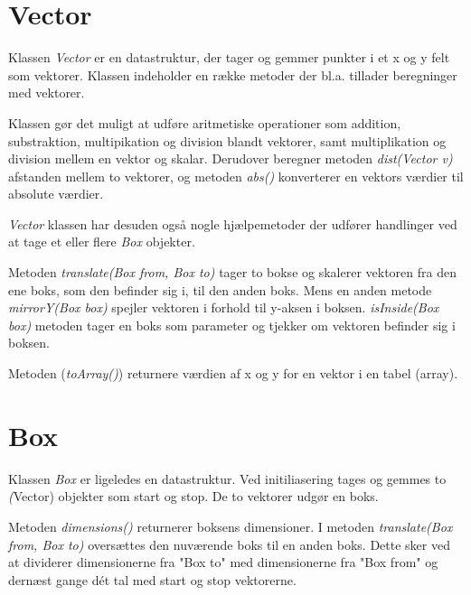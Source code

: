 \section{Vector}

Klassen \emph{Vector} er en datastruktur, der tager og gemmer punkter i et x og y felt som vektorer. Klassen indeholder en række metoder der bl.a. tillader beregninger med vektorer.

Klassen gør det muligt at udføre aritmetiske operationer som addition, substraktion, multipikation og division blandt vektorer, samt multiplikation og division mellem en vektor og skalar. Derudover beregner metoden \emph{dist(Vector v)} afstanden mellem to vektorer, og metoden \emph{abs()} konverterer en vektors værdier til absolute værdier.

\emph{Vector} klassen har desuden også nogle hjælpemetoder der udfører handlinger ved at tage et eller flere \emph{Box} objekter.

Metoden \emph{translate(Box from, Box to)} tager to bokse og skalerer vektoren fra den ene boks, som den befinder sig i, til den anden boks. Mens en anden metode \emph{mirrorY(Box box)} spejler vektoren i forhold til y-aksen i boksen. \emph{isInside(Box box)} metoden tager en boks som parameter og tjekker om vektoren befinder sig i boksen.

Metoden (\emph{toArray()}) returnere værdien af x og y for en vektor i en tabel (array).


\section{Box}

Klassen \emph{Box} er ligeledes en datastruktur. Ved initiliasering tages og gemmes to \emph(Vector) objekter som start og stop. De to vektorer udgør en boks.

Metoden \emph{dimensions()} returnerer boksens dimensioner. I metoden \emph{translate(Box from, Box to)} oversættes den nuværende boks til en anden boks. Dette sker ved at dividerer dimensionerne fra "Box to" med dimensionerne fra "Box from" og dernæst gange dét tal med start og stop vektorerne.

